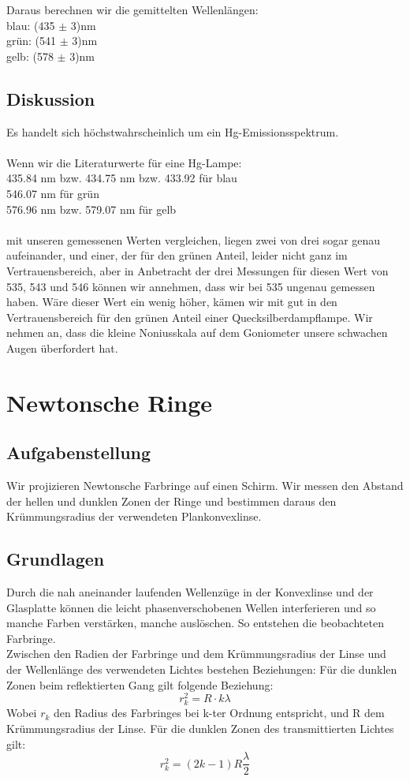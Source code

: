 \documentclass{article}
\begin{document}
Daraus berechnen wir die gemittelten Wellenlängen:\\
blau: (435 $\pm$ 3)nm\\
grün: (541 $\pm$ 3)nm\\
gelb: (578 $\pm$ 3)nm\\

\subsection{Diskussion}
Es handelt sich höchstwahrscheinlich um ein Hg-Emissionsspektrum.\\
\\
Wenn wir die 
Literaturwerte für eine Hg-Lampe:\\
435.84 nm bzw. 434.75 nm bzw. 433.92 für blau\\
546.07 nm für grün\\
576.96 nm bzw. 579.07 nm für gelb\\
\\
mit unseren gemessenen Werten vergleichen, liegen zwei von drei sogar genau aufeinander, und einer, der für den grünen Anteil, leider nicht ganz im Vertrauensbereich, aber in Anbetracht der drei Messungen für diesen Wert von 535, 543 und 546 können wir annehmen, dass wir bei 535 ungenau gemessen haben. Wäre dieser Wert ein wenig höher, kämen wir mit gut in den Vertrauensbereich für den grünen Anteil einer Quecksilberdampflampe. Wir nehmen an, dass die kleine Noniusskala auf dem Goniometer unsere schwachen Augen überfordert hat.


\section{Newtonsche Ringe}

\subsection{Aufgabenstellung}
Wir projizieren Newtonsche Farbringe auf einen Schirm. Wir messen den Abstand der hellen und dunklen Zonen der Ringe und bestimmen daraus den Krümmungsradius der verwendeten Plankonvexlinse.
\subsection{Grundlagen}
Durch die nah aneinander laufenden Wellenzüge in der Konvexlinse und der Glasplatte können die leicht phasenverschobenen Wellen interferieren und so manche Farben verstärken, manche auslöschen. So entstehen die beobachteten Farbringe. \\
Zwischen den Radien der Farbringe und dem Krümmungsradius der Linse und der Wellenlänge des verwendeten Lichtes bestehen Beziehungen:
Für die dunklen Zonen beim reflektierten Gang gilt folgende Beziehung:
\begin{equation}
\label{reflexionradius}
r_k^2=R\cdot k\lambda
\end{equation}
Wobei $r_k$ den Radius des Farbringes bei k-ter Ordnung entspricht, und R dem Krümmungsradius der Linse.
Für die dunklen Zonen des transmittierten Lichtes gilt:
\begin{equation}
\label{transradius}
r_k^2=(2k-1)R\frac{\lambda}{2}
\end{equation}
\end{document}
